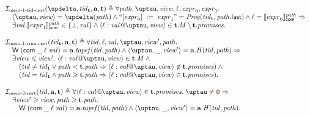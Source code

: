 \[\begin{array}{l}
\invMemZeroCERT(\delta, \tId_{\tT}, \aT, \tT) \triangleq
      \forall \cpath, \tau, \R, \loc, \expr_0, \expr_1. \\
\quad \angled{\tau, \R} = \delta(\cpath) \land
      ``\writeInst{\expr_0}{\expr_1}" = \Cfarm(\tId_{\tT}, \lastInstr{\cpath}) \land \loc = \semfcom{\expr_0}{\cpath} \Rightarrow \\
\quad \exists \stval. \semfcom{\expr_1}{\cpath} \in \{\bot, \stval\} \land
      \writeEvt{\loc}{\stval}{\tau}{\R} \in \tT.\Mprom \setminus \tT.\PromSet. \\
\\
\invMemOneCERT(\tId_{\tT}, \aT, \tT) \triangleq \forall \tId, \loc, \stval, \tau, \R', \cpath. \\
  \quad \tapeWrite{(\tapeWriteCommitted{\_}{\loc}{\stval})} = \aT.\tapef(\tId, \cpath) \land
        \angled{\tau, \_, \R'} = \aT.\hmap(\tId, \cpath) \Rightarrow \\
  \quad \exists \R \le \R'. \; \writeEvt{\loc}{\stval}{\tau}{\R} \in \tT.\Mprom \land {} \\
  \qquad (\tId \not = \tId_{\tT} \lor \cpath <   \tT.\cpath \Rightarrow
               \writeEvt{\loc}{\stval}{\tau}{\R} \not \in \tT.\PromSet) \land {} \\
  \qquad (\tId = \tId_{\tT} \land \cpath \ge \tT.\cpath \Rightarrow
               \writeEvt{\loc}{\stval}{\tau}{\R} \in \tT.\PromSet).\\
\\
\invMemTwoCERT(\tId, \aT, \tT) \triangleq \forall \writeEvt{\loc}{\stval}{\tau}{\R} \in \tT.\PromSet. \;
     \tau \not = \tstamp{0} \Rightarrow \\
  \quad \exists \R' \ge \R, \cpath \ge \tT.\cpath . \\
  \qquad \tapeWrite{(\tapeWriteCommitted{\_}{\loc}{\stval})} = \aT.\tapef(\tId, \cpath) \land
              \angled{\tau, \_, \R'} = \aT.\hmap(\tId, \cpath). \\
\end{array}\]

